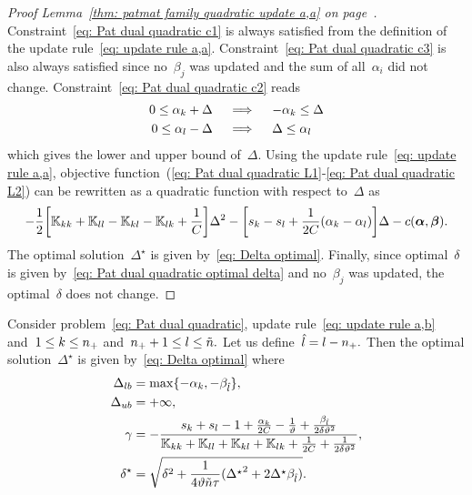 \begin{proof}[Proof Lemma~\ref{thm: patmat family quadratic update a,a} on page~\pageref{thm: patmat family quadratic update a,a}]
  Constraint~\eqref{eq: Pat dual quadratic c1} is always satisfied from the definition of the update rule~\eqref{eq: update rule a,a}. Constraint~\eqref{eq: Pat dual quadratic c3} is also always satisfied since no~$\beta_j$ was updated and the sum of all~$\alpha_i$ did not change. Constraint~\eqref{eq: Pat dual quadratic c2} reads
  \begin{align*}
    0 \leq \alpha_k + \Delta
    & \quad \implies \quad
    - \alpha_k \leq \Delta \\
    0 \leq \alpha_l - \Delta
    & \quad \implies \quad
    \Delta \leq \alpha_l
  \end{align*}
  which gives the lower and upper bound of~$\Delta.$ Using the update rule~\eqref{eq: update rule a,a}, objective function~(\ref{eq: Pat dual quadratic L1}-\ref{eq: Pat dual quadratic L2}) can be rewritten as a quadratic function with respect to~$\Delta$ as
  \begin{equation*}
    - \frac{1}{2} \Brac[s]{\K_{kk} + \K_{ll} - \K_{kl} - \K_{lk} + \frac{1}{C}} \Delta^2
    - \Brac[s]{s_k - s_l + \frac{1}{2C}(\alphak - \alphal)} \Delta
    - c(\bm{\alpha}, \bm{\beta}).
  \end{equation*}
  The optimal solution~$\Delta^{\star}$ is given by~\eqref{eq: Delta optimal}. Finally, since optimal~$\delta$ is given by~\eqref{eq: Pat dual quadratic optimal delta} and no~$\beta_j$ was updated, the optimal~$\delta$ does not change.
\end{proof}

\begin{lemma}\label{thm: patmat family quadratic update a,b}
  Consider problem~\eqref{eq: Pat dual quadratic}, update rule~\eqref{eq: update rule a,b} and~$1 \leq k \leq n_{+}$ and~$n_{+} + 1 \leq l \leq \tilde{n}.$ Let us define~$\hat{l} = l - n_{+}.$ Then the optimal solution~$\Delta^{\star}$ is given by~\eqref{eq: Delta optimal} where
  \begin{align*}
    \Delta_{lb} & = \max\{- \alpha_k, - \beta_{\hat{l}}\}, \\
    \Delta_{ub} & = +\infty, \\
    \gamma      & = -\frac{s_k + s_l  - 1 + \frac{\alpha_k}{2C} - \frac{1}{\vartheta} + \frac{\beta_{\hat{l}}}{2 \delta \vartheta^2}}{\mathbb{K}_{kk} + \mathbb{K}_{ll} + \mathbb{K}_{kl} + \mathbb{K}_{lk} + \frac{1}{2C} + \frac{1}{2 \delta \vartheta^2}}, \\
    \delta^{\star}  & = \sqrt{\delta^2 + \frac{1}{4 \vartheta \tilde{n} \tau}({\Delta^{\star}}^2 + 2 \Delta^{\star} \beta_{\hat{l}})}.
  \end{align*}
\end{lemma}

